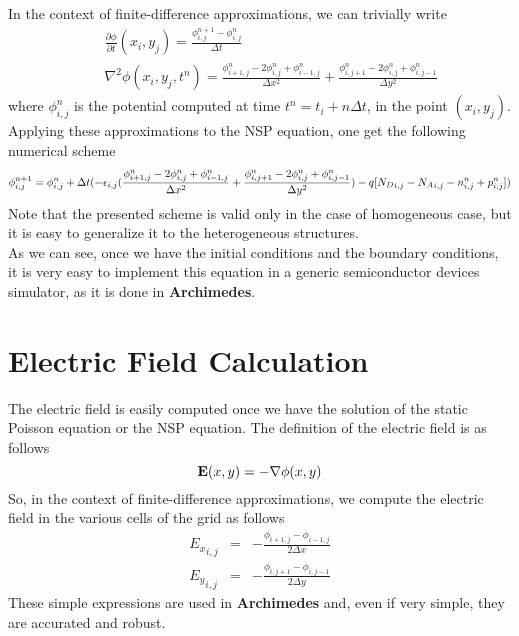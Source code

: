 \documentclass[12pt]{book}
\begin{document}
In the context of finite-difference approximations, we can trivially write
\begin{eqnarray}
& & \frac{\partial \phi}{\partial t} (x_i,y_j) = \frac{\phi^{n+1}_{i,j}-\phi^n_{i,j}}{\Delta t} \\
& & \nabla^2 \phi (x_i,y_j,t^n) = \frac{\phi_{i+1,j}^n - 2 \phi_{i,j}^n + \phi_{i-1,j}^n}{\Delta x^2} + \frac{\phi_{i,j+1}^n - 2 \phi_{i,j}^n + \phi_{i,j-1}^n}{\Delta y^2}
\end{eqnarray}
where $\phi^n_{i,j}$ is the potential computed at time $t^n=t_i + n \Delta t$, in the point $(x_i,y_j)$.
\\
Applying these approximations to the NSP equation, one get the following numerical scheme
\begin{equation}
 \phi^{n+1}_{i,j} = \phi^n_{i,j} + \Delta t (- \epsilon_{i,j} (\frac{\phi_{i+1,j}^n - 2 \phi_{i,j}^n + \phi_{i-1,j}^n}{\Delta x^2} + \frac{\phi_{i,j+1}^n - 2 \phi_{i,j}^n + \phi_{i,j-1}^n}{\Delta y^2}) \\
 - q [ {N_D}_{i,j} - {N_A}_{i,j} - n_{i,j}^n + p_{i,j}^n] )
\end{equation}
Note that the presented scheme is valid only in the case of homogeneous case, but it is easy to generalize it to the heterogeneous structures.
\\
As we can see, once we have the initial conditions and the boundary conditions, it is very easy to implement this equation in a generic semiconductor devices simulator, as it is done in \textbf{Archimedes}.

\section{Electric Field Calculation}

The electric field is easily computed once we have the solution of the static Poisson equation or the NSP equation. The definition of the electric field is as follows
\begin{equation}
 {\bf E} (x,y) = - \nabla \phi (x,y)
\end{equation}
So, in the context of finite-difference approximations, we compute the electric field in the various cells of the grid as follows
\begin{eqnarray}
 {E_x}_{i,j} &=& - \frac{\phi_{i+1,j}- \phi_{i-1,j}}{2 \Delta x} \\
 {E_y}_{i,j} &=& - \frac{\phi_{i,j+1}- \phi_{i,j-1}}{2 \Delta y}
\end{eqnarray}
These simple expressions are used in \textbf{Archimedes} and, even if very simple, they are accurated and robust.
\end{document}
